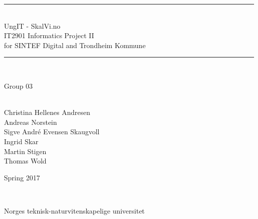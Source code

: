 \thispagestyle{empty}
\begin{center}


\noindent\rule{\textwidth}{1.3pt}
\\[1pc]
\Huge{UngIT - SkalVi.no}
\\[1pc]
\large{IT2901 Informatics Project II  \\for SINTEF Digital and Trondheim Kommune}
\\[1pc]
\noindent\rule{\textwidth}{1.3pt}
\\[2pc]


\begin{bf}\Large{Group 03}\end{bf}
\\[1pc]

Christina Hellenes Andresen\\
Andreas Norstein\\
Sigve André Evensen Skaugvoll\\
Ingrid Skar\\
Martin Stigen\\
Thomas Wold\\
[4pc]


\begin{bf}
Spring 2017
\end{bf}
\\[3pc]


\begin{small}Norges teknisk-naturvitenskapelige universitet\end{small}

\end{center}

\pagebreak